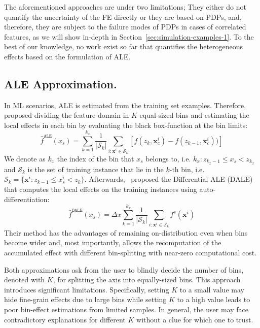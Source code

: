 \documentclass[twoside]{article}
\newcommand{\xc}{\mathbf{x}_c}
\newcommand{\xb}{\mathbf{x}}
\begin{document}
The aforementioned approaches are under two limitations; They either
do not quantify the uncertainty of the FE directly or they are based
on PDPs, and, therefore, they are subject to the failure modes of PDPs
in cases of correlated features\citep{baniecki2021fooling}, as we will
show in-depth in Section~\ref{sec:simulation-examples-1}. To the best
of our knowledge, no work exist so far that quantifies the
heterogeneous effects based on the formulation of ALE.

\subsection{ALE Approximation.}
\label{sec:ale-approximation}

In ML scenarios, ALE is estimated from the training set
examples. Therefore, \citep{apley2020visualizing} proposed dividing
the feature domain in \(K\) equal-sized bins and estimating the local effects in
each bin by evaluating the black box-function at the bin limits:
\begin{equation}
  \label{eq:ALE_accumulated_mean_est}
  \hat{f}^{\mathtt{ALE}}(x_s) = \sum_{k=1}^{k_x} \frac{1}{|\mathcal{S}_k|} \sum_{i:\mathbf{x}^i \in
    \mathcal{S}_k} \left [ f(z_{k}, \xc^i) - f(z_{k-1}, \xc^i)) \right ]
\end{equation}
We denote as \(k_x\) the index of the bin that \(x_s\) belongs to,
i.e. \(k_x: z_{k_x-1} \leq x_s < z_{k_x} \) and \(\mathcal{S}_k\) is
the set of training instance that lie in the \(k\)-th bin, i.e.
\( \mathcal{S}_k = \{ \xb^i : z_{k-1} \leq x^i_s < z_{k} \}
\). Afterwards,~\citep{gkolemis22} proposed the Differential ALE
(DALE) that computes the local effects on the training instances using
auto-differentiation:
\begin{equation}
  \label{eq:DALE_accumulated_mean_est}
  \hat{f}^{\mathtt{DALE}}(x_s) = \Delta x \sum_{k=1}^{k_x} \frac{1}{|\mathcal{S}_k|} \sum_{i:\mathbf{x}^i \in
    \mathcal{S}_k} f^s(\mathbf{x}^i)
\end{equation}
%
Their method has the advantages of remaining on-distribution even when
bins become wider and, most importantly, allows the recomputation of
the accumulated effect with different bin-splitting with near-zero
computational cost.

Both approximations ask from the user to blindly decide the number of
bins, denoted with \(K\), for splitting the axis into equally-sized
bins. This approach introduces significant limitations. Specifically, setting \(K\) to a small
value may hide fine-grain effects due to large bins while setting \(K\)
to a high value leads to poor bin-effect estimations from limited
samples. In general, the user may face contradictory explanations for
different \(K\) without a clue for which one to trust.
\end{document}
